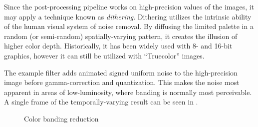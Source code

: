 Since the post-processing pipeline works on high-precision values of the images, it may apply a technique known as \emph{dithering}. Dithering utilizes the intrinsic ability of the human visual system of noise removal. By diffusing the limited palette in a random (or semi-random) spatially-varying pattern, it creates the illusion of higher color depth. Historically, it has been widely used with 8- and 16-bit graphics, however it can still be utilized with ``Truecolor'' images.

The example filter adds animated signed uniform noise to the high-precision image before gamma-correction and quantization. This makes the noise most apparent in areas of low-luminosity, where banding is normally most perceivable. A single frame of the temporally-varying result can be seen in .

\begin{figure}[ht!]
  \centering
  \caption[Color banding reduction]{Color banding reduction}
  \label{fig:postProcBandingNoBanding}
\end{figure}
